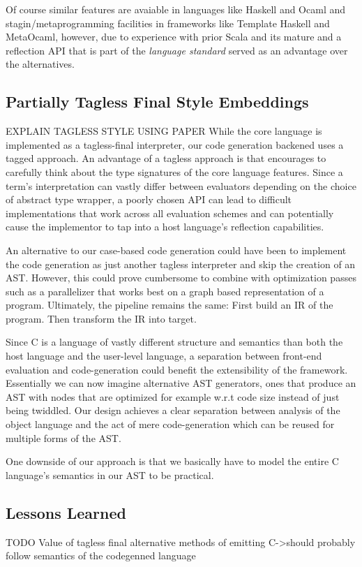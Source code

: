 \documentclass{article}
\begin{document}
Of course similar features are avaiable in languages like Haskell and Ocaml and stagin/metaprogramming facilities in frameworks like Template Haskell and MetaOcaml, however, due to experience with prior Scala and its mature and a reflection API that is part of the \textit{language standard}
served as an advantage over the alternatives.

\subsection{Partially Tagless Final Style Embeddings}\label{subsec:tagless}
EXPLAIN TAGLESS STYLE USING PAPER While the core language is implemented as a tagless-final interpreter, our code generation backened uses a tagged approach. An advantage of a tagless approach is that encourages to carefully think about the type signatures of the core language features. Since a term's interpretation
can vastly differ between evaluators depending on the choice of abstract type wrapper, a poorly chosen API can lead to difficult implementations that work across all evaluation schemes and can potentially cause the implementor to tap into a host language's reflection capabilities.

An alternative to our case-based code generation could have been to implement the code generation as just another tagless interpreter and skip the creation of an AST. However, this could prove cumbersome to combine with optimization passes such as a parallelizer that works best on a graph based representation of a program. Ultimately,
the pipeline remains the same: First build an IR of the program. Then transform the IR into target.

Since C is a language of vastly different structure and semantics than both the host language and the user-level language, a separation between front-end evaluation and code-generation could benefit the extensibility of the framework. Essentially we can now imagine alternative AST generators, ones that produce an AST with nodes that are optimized for example w.r.t code size instead of just being twiddled. Our design achieves
a clear separation between analysis of the object language and the act of mere code-generation which can be reused for multiple forms of the AST.

One downside of our approach is that we basically have to model the entire C language's semantics in our AST to be practical.

\subsection{Lessons Learned}
TODO
Value of tagless final
alternative methods of emitting C->should probably follow semantics of the codegenned language
\end{document}

